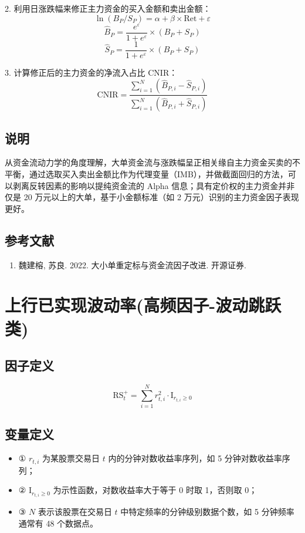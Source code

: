 \documentclass{article}
\begin{document}
2. 利用日涨跌幅来修正主力资金的买入金额和卖出金额：
\begin{equation}
    \ln(B_P / S_P) = \alpha + \beta \times \mathrm{Ret} + \varepsilon
\end{equation}
\begin{equation}
    \hat{B}_P = \frac{e^{\varepsilon}}{1 + e^{\varepsilon}} \times (B_P + S_P)
\end{equation}
\begin{equation}
    \hat{S}_P = \frac{1}{1 + e^{\varepsilon}} \times (B_P + S_P)
\end{equation}

3. 计算修正后的主力资金的净流入占比 \( \mathrm{CNIR} \)：
\begin{equation}
    \mathrm{CNIR} = \frac{\sum_{i=1}^N (\hat{B}_{P,i} - \hat{S}_{P,i})}{\sum_{i=1}^N (\hat{B}_{P,i} + \hat{S}_{P,i})}
\end{equation}

\subsection{说明}
从资金流动力学的角度理解，大单资金流与涨跌幅呈正相关缘自主力资金买卖的不平衡，通过选取买入卖出金额比作为代理变量（IMB），并做截面回归的方法，可以剥离反转因素的影响以提纯资金流的 Alpha 信息；具有定价权的主力资金并非仅是 20 万元以上的大单，基于小金额标准（如 2 万元）识别的主力资金因子表现更好。

\subsection{参考文献}
\begin{enumerate}
    \item 魏建榕, 苏良. 2022. 大小单重定标与资金流因子改进. 开源证券.
\end{enumerate}

\section{上行已实现波动率(高频因子-波动跳跃类)}

\subsection{因子定义}
\begin{equation}
    \mathrm{RS}_t^+ = \sum_{i=1}^N r_{t,i}^2 \cdot \mathrm{I}_{r_{t,i} \geq 0}
\end{equation}

\subsection{变量定义}
\begin{itemize}
    \item ① \( r_{t,i} \) 为某股票交易日 \( t \) 内的分钟对数收益率序列，如 5 分钟对数收益率序列；
    \item ② \( \mathrm{I}_{r_{t,i} \geq 0} \) 为示性函数，对数收益率大于等于 0 时取 1，否则取 0；
    \item ③ \( N \) 表示该股票在交易日 \( t \) 中特定频率的分钟级别数据个数，如 5 分钟频率通常有 48 个数据点。
\end{itemize}
\end{document}
